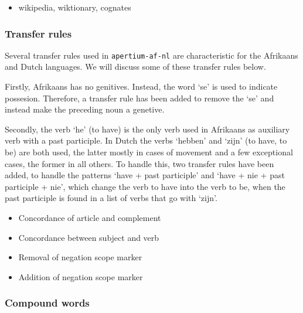 \documentclass[11pt]{article}
\begin{document}
\begin{itemize}
\item wikipedia, wiktionary, cognates
\end{itemize}

\subsubsection{Transfer rules}


Several transfer rules used in {\small {\tt apertium-af-nl}}  are characteristic for the
Afrikaans and Dutch languages. We will discuss some of these transfer rules below.

Firstly, Afrikaans has no genitives. Instead, the word `se' is used to indicate possesion. 
Therefore, a transfer rule has been added to remove the `se' and instead make the preceding
noun a genetive.


Secondly, the verb `he' (to have) is the only verb used in Afrikaans as auxiliary
verb with a past participle. In Dutch the verbs `hebben' and `zijn' (to have, to be)
are both used, the latter mostly in cases of movement and a few exceptional cases, the
former in all others. To handle this, two transfer rules have been added, to handle the
patterns `have + past participle' and `have + nie + past participle + nie', which change the
verb to have into the verb to be, when the past participle is found in a list of verbs that go with
`zijn'.


\begin{itemize}
\item Concordance of article and complement
\item Concordance between subject and verb
\item Removal of negation scope marker
\end{itemize}

\begin{itemize}
\item Addition of negation scope marker
\end{itemize}


\subsubsection{Compound words}
\end{document}
